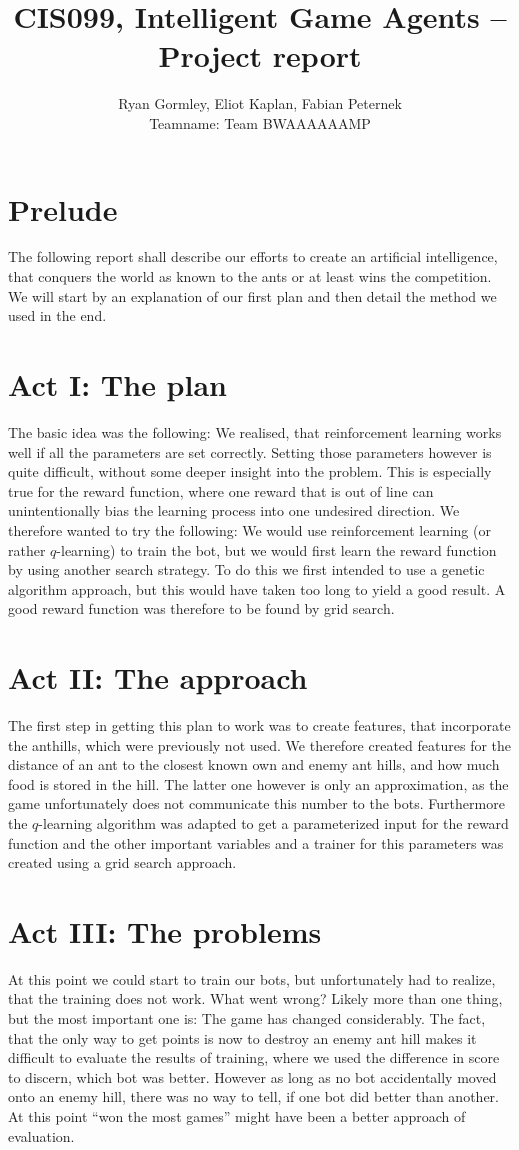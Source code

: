 \documentclass{article}
\title{CIS099, Intelligent Game Agents -- Project report}
\author{Ryan Gormley, Eliot Kaplan, Fabian Peternek \\ Teamname: Team BWAAAAAAMP}
\begin{document}
\maketitle
\section*{Prelude}
The following report shall describe our efforts to create an artificial intelligence, that conquers
the world as known to the ants or at least wins the competition. We will start by an explanation of
our first plan and then detail the method we used in the end.
\section*{Act I: The plan}
The basic idea was the following: We realised, that reinforcement learning works well if all the
parameters are set correctly. Setting those parameters however is quite difficult, without some
deeper insight into the problem. This is especially true for the reward function, where one reward
that is out of line can unintentionally bias the learning process into one undesired direction. We
therefore wanted to try the following: We would use reinforcement learning (or rather $q$-learning)
to train the bot, but we would first learn the reward function by using another search strategy. To
do this we first intended to use a genetic algorithm approach, but this would have taken too long to
yield a good result. A good reward function was therefore to be found by grid search.
\section*{Act II: The approach}
The first step in getting this plan to work was to create features, that incorporate the anthills,
which were previously not used. We therefore created features for the distance of an ant to the
closest known own and enemy ant hills, and how much food is stored in the hill. The latter one
however is only an approximation, as the game unfortunately does not communicate this number to the
bots. Furthermore the $q$-learning algorithm was adapted to get a parameterized input for the reward
function and the other important variables and a trainer for this parameters was created using a
grid search approach.
\section*{Act III: The problems}
At this point we could start to train our bots, but unfortunately had to realize, that the training
does not work. What went wrong? Likely more than one thing, but the most important one is: The game
has changed considerably. The fact, that the only way to get points is now to destroy an enemy ant
hill makes it difficult to evaluate the results of training, where we used the difference in score
to discern, which bot was better. However as long as no bot accidentally moved onto an enemy hill,
there was no way to tell, if one bot did better than another. At this point ``won the most games''
might have been a better approach of evaluation.
\end{document}
